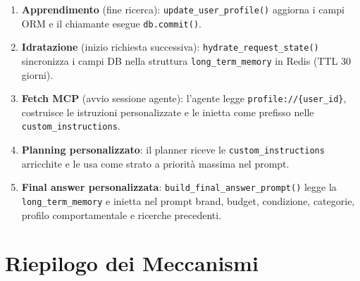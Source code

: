\begin{enumerate}
    \item \textbf{Apprendimento} (fine ricerca): \texttt{update\_user\_profile()}
        aggiorna i campi ORM e il chiamante esegue \texttt{db.commit()}.

    \item \textbf{Idratazione} (inizio richiesta successiva):
        \texttt{hydrate\_request\_state()} sincronizza i campi DB nella
        struttura \texttt{long\_term\_memory} in Redis (TTL 30 giorni).

    \item \textbf{Fetch MCP} (avvio sessione agente): l'agente legge
        \texttt{profile://\{user\_id\}}, costruisce le istruzioni
        personalizzate e le inietta come prefisso nelle
        \texttt{custom\_instructions}.

    \item \textbf{Planning personalizzato}: il planner riceve le
        \texttt{custom\_instructions} arricchite e le usa come strato
        a priorità massima nel prompt.

    \item \textbf{Final answer personalizzata}: \texttt{build\_final\_answer\_prompt()}
        legge la \texttt{long\_term\_memory} e inietta nel prompt
        brand, budget, condizione, categorie, profilo comportamentale
        e ricerche precedenti.
\end{enumerate}


\section{Riepilogo dei Meccanismi}
\label{sec:profiling-summary}

